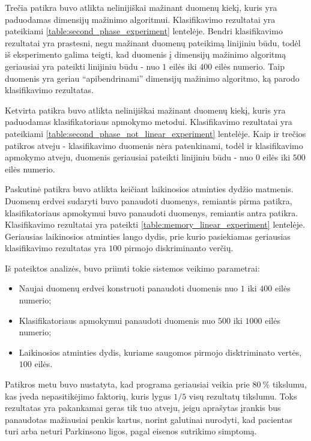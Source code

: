 \documentclass[]{vgtuef}
\begin{document}
Trečia patikra buvo atlikta nelinijiškai mažinant duomenų kiekį, kuris yra paduodamas dimensijų mažinimo algoritmui. Klasifikavimo rezultatai yra pateikiami \ref{table:second_phase_experiment} lentelėje. Bendri klasifikavimo rezultatai yra prastesni, negu mažinant duomenų pateikimą linijiniu būdu, todėl iš eksperimento galima teigti, kad duomenis į dimensijų mažinimo algoritmą geriausiai yra pateikti linijiniu būdu - nuo $1$ eilės iki $400$ eilės numerio. Taip duomenis yra geriau ``apibendrinami'' dimensijų mažinimo algoritmo, ką parodo klasifikavimo rezultatas.

Ketvirta patikra buvo atlikta nelinijiškai mažinant duomenų kiekį, kuris yra paduodamas klasifikatoriaus apmokymo metodui. Klasifikavimo rezultatai yra pateikiami \ref{table:second_phase_not_linear_experiment} lentelėje. Kaip ir trečios patikros atveju - klasifikavimo duomenis nėra patenkinami, todėl ir klasifikavimo apmokymo atveju, duomenis geriausiai pateikti linijiniu būdu - nuo $0$  eilės iki $500$ eilės numerio.

Paskutinė patikra buvo atlikta keičiant laikinosios atminties dydžio matmenis. Duomenų erdvei sudaryti buvo panaudoti duomenys, remiantis pirma patikra, klasifikatoriaus apmokymui buvo panaudoti duomenys, remiantis antra patikra. Klasifikavimo rezultatai yra pateikti \ref{table:memory_linear_experiment} lentelėje. Geriausias laikinosios atminties lango dydis, prie kurio pasiekiamas geriausias klasifikavimo rezultatas yra $100$ pirmojo diskriminanto verčių.

Iš pateiktos analizės, buvo priimti tokie sistemos veikimo parametrai:
\begin{itemize}
\item Naujai duomenų erdvei konstruoti panaudoti duomenis nuo $1$ iki $400$ eilės numerio;
\item Klasifikatoriaus apmokymui panaudoti duomenis nuo $500$ iki $1000$ eilės numerio;
\item Laikinosios atminties dydis, kuriame saugomos pirmojo disktriminato vertės, $100$ eilės.
\end{itemize}

Patikros metu buvo nustatyta, kad programa geriausiai veikia prie $80~\%$ tikslumu, kas įveda nepasitikėjimo faktorių, kuris lygus $1/5$ visų rezultatų tikslumu. Toks rezultatas yra pakankamai geras tik tuo atveju, jeigu aprašytas įrankis bus panaudotas mažiausiai penkis kartus, norint galutinai nurodyti, kad pacientas turi arba neturi Parkinsono ligos, pagal eisenos sutrikimo simptomą.
\end{document}
